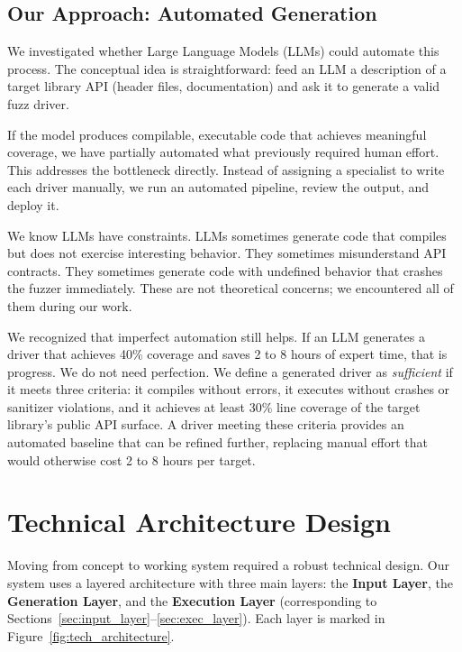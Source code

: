\subsection{Our Approach: Automated Generation}
We investigated whether Large Language Models (LLMs) could automate this process. The conceptual idea is straightforward: feed an LLM a description of a target library API (header files, documentation) and ask it to generate a valid fuzz driver.

If the model produces compilable, executable code that achieves meaningful coverage, we have partially automated what previously required human effort. This addresses the bottleneck directly. Instead of assigning a specialist to write each driver manually, we run an automated pipeline, review the output, and deploy it.

We know LLMs have constraints. LLMs sometimes generate code that compiles but does not exercise interesting behavior. They sometimes misunderstand API contracts. They sometimes generate code with undefined behavior that crashes the fuzzer immediately. These are not theoretical concerns; we encountered all of them during our work.

We recognized that imperfect automation still helps. If an LLM generates a driver that achieves 40\% coverage and saves 2 to 8 hours of expert time, that is progress. We do not need perfection. We define a generated driver as \emph{sufficient} if it meets three criteria: it compiles without errors, it executes without crashes or sanitizer violations, and it achieves at least 30\% line coverage of the target library's public API surface. A driver meeting these criteria provides an automated baseline that can be refined further, replacing manual effort that would otherwise cost 2 to 8 hours per target.

\section{Technical Architecture Design}
\label{sec:meth_architecture}

Moving from concept to working system required a robust technical design. Our system uses a layered architecture with three main layers: the \textbf{Input Layer}, the \textbf{Generation Layer}, and the \textbf{Execution Layer} (corresponding to Sections~\ref{sec:input_layer}--\ref{sec:exec_layer}). Each layer is marked in Figure~\ref{fig:tech_architecture}.

